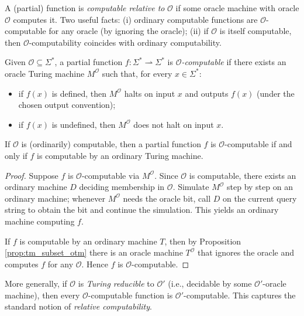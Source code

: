 A (partial) function is \emph{computable relative to} $\mathcal{O}$ if some oracle machine with oracle $\mathcal{O}$ computes it. Two useful facts: (i) ordinary computable functions are $\mathcal{O}$-computable for any oracle (by ignoring the oracle); (ii) if $\mathcal{O}$ is itself computable, then $\mathcal{O}$-computability coincides with ordinary computability.

\begin{definition}
Given $\mathcal{O}\subseteq\Sigma^\ast$, a partial function $f:\Sigma^\ast\rightharpoonup\Sigma^\ast$ is \emph{$\mathcal{O}$-computable} if there exists an oracle Turing machine $M^{\mathcal{O}}$ such that, for every $x\in\Sigma^\ast$:
\begin{itemize}
\item if $f(x)$ is defined, then $M^{\mathcal{O}}$ halts on input $x$ and outputs $f(x)$ (under the chosen output convention);
\item if $f(x)$ is undefined, then $M^{\mathcal{O}}$ does not halt on input $x$.
\end{itemize}
\end{definition}

\begin{proposition}
\label{prop:O_comp_equals_comp_if_O_decidable}
If $\mathcal{O}$ is (ordinarily) computable, then a partial function $f$ is $\mathcal{O}$-computable if and only if $f$ is computable by an ordinary Turing machine.
\end{proposition}
\begin{proof}
Suppose $f$ is $\mathcal{O}$-computable via $M^{\mathcal{O}}$. Since $\mathcal{O}$ is computable, there exists an ordinary machine $D$ deciding membership in $\mathcal{O}$. Simulate $M^{\mathcal{O}}$ step by step on an ordinary machine; whenever $M^{\mathcal{O}}$ needs the oracle bit, call $D$ on the current query string to obtain the bit and continue the simulation. This yields an ordinary machine computing $f$.

If $f$ is computable by an ordinary machine $T$, then by Proposition \ref{prop:tm_subset_otm} there is an oracle machine $T^{\mathcal{O}}$ that ignores the oracle and computes $f$ for any $\mathcal{O}$. Hence $f$ is $\mathcal{O}$-computable.
\end{proof}

More generally, if $\mathcal{O}$ is \emph{Turing reducible} to $\mathcal{O}'$ (i.e., decidable by some $\mathcal{O}'$-oracle machine), then every $\mathcal{O}$-computable function is $\mathcal{O}'$-computable. This captures the standard notion of \emph{relative computability}.

